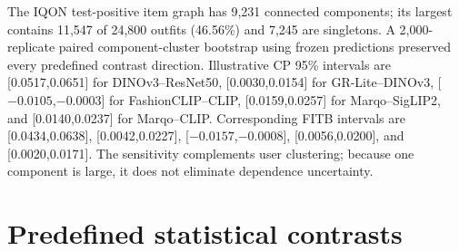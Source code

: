 \documentclass[pdflatex,sn-mathphys-num,iicol]{sn-jnl}
\begin{document}
The IQON test-positive item graph has 9,231 connected components; its largest contains 11,547 of 24,800 outfits (46.56\%) and 7,245 are singletons. A 2,000-replicate paired component-cluster bootstrap using frozen predictions preserved every predefined contrast direction. Illustrative CP 95\% intervals are [0.0517,0.0651] for DINOv3--ResNet50, [0.0030,0.0154] for GR-Lite--DINOv3, [$-0.0105$,$-0.0003$] for FashionCLIP--CLIP, [0.0159,0.0257] for Marqo--SigLIP2, and [0.0140,0.0237] for Marqo--CLIP. Corresponding FITB intervals are [0.0434,0.0638], [0.0042,0.0227], [$-0.0157$,$-0.0008$], [0.0056,0.0200], and [0.0020,0.0171]. The sensitivity complements user clustering; because one component is large, it does not eliminate dependence uncertainty.

\section{Predefined statistical contrasts}
\end{document}

